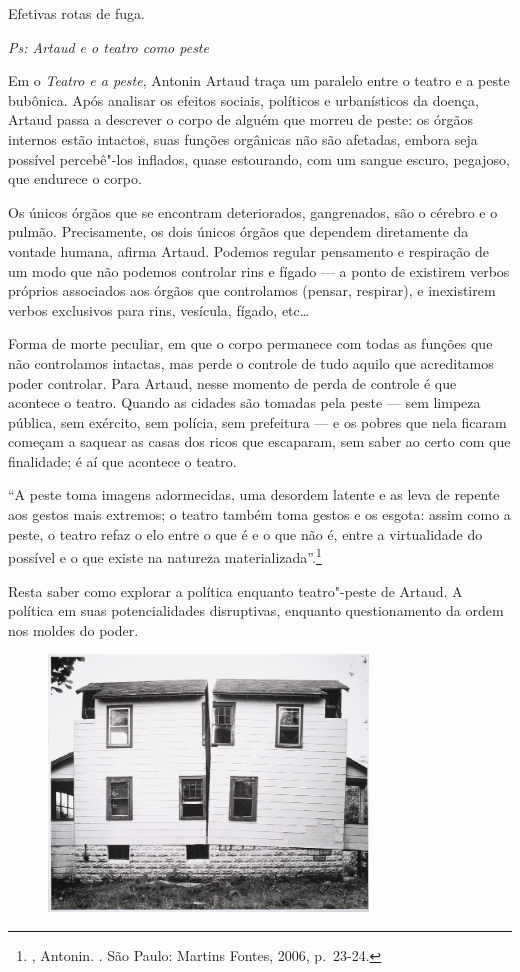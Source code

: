Efetivas rotas de fuga.

\asterisc

\emph{Ps: Artaud e o teatro como peste}

Em o \emph{Teatro e a peste}, Antonin Artaud traça um paralelo entre o
teatro e a peste bubônica. Após analisar os efeitos sociais, políticos e
urbanísticos da doença, Artaud passa a descrever o corpo de alguém que
morreu de peste: os órgãos internos estão intactos, suas funções
orgânicas não são afetadas, embora seja possível percebê"-los inflados,
quase estourando, com um sangue escuro, pegajoso, que endurece o corpo.

Os únicos órgãos que se encontram deteriorados, gangrenados, são o
cérebro e o pulmão. Precisamente, os dois únicos órgãos que dependem
diretamente da vontade humana, afirma Artaud. Podemos regular
pensamento e respiração de um modo que não podemos controlar rins e
fígado --- a ponto de existirem verbos próprios associados aos órgãos que
controlamos (pensar, respirar), e inexistirem verbos exclusivos para
rins, vesícula, fígado, etc\ldots{}

Forma de morte peculiar, em que o corpo permanece com todas as funções
que não controlamos intactas, mas perde o controle de tudo aquilo que
acreditamos poder controlar. Para Artaud, nesse momento de perda de
controle é que acontece o teatro. Quando as cidades são tomadas pela
peste --- sem limpeza pública, sem exército, sem polícia, sem prefeitura ---
e os pobres que nela ficaram começam a saquear as casas dos ricos que
escaparam, sem saber ao certo com que finalidade; é aí que acontece o
teatro.

``A peste toma imagens adormecidas, uma desordem latente e as leva de
repente aos gestos mais extremos; o teatro também toma gestos e os
esgota: assim como a peste, o teatro refaz o elo entre o que é e o que
não é, entre a virtualidade do possível e o que existe na natureza
materializada''.\footnote{, Antonin. {}.
  São Paulo: Martins Fontes, 2006, p.~23-24.}

Resta saber como explorar a política enquanto teatro"-peste de Artaud. A
política em suas potencialidades disruptivas, enquanto questionamento da
ordem nos moldes do poder.

\begin{figure}[!ht]
\centering
 \includegraphics[width=85mm]{./imgs/cuts.jpg}
\caption{\tiny{}}
\end{figure}

